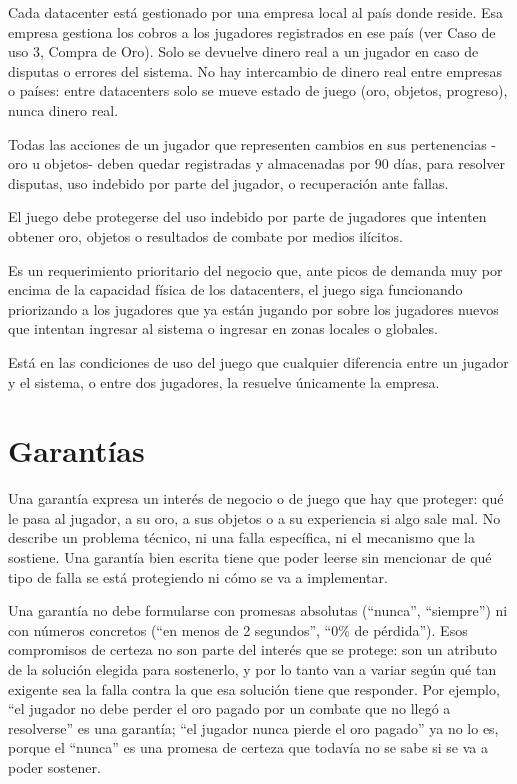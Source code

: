 \documentclass[variant=guia,cover=institutional,mode=screen]{ua-engineering-v6-article}
\begin{document}
    Cada datacenter está gestionado por una empresa local al país donde reside.
    Esa empresa gestiona los cobros a los jugadores registrados en ese país (ver Caso de uso 3, Compra de Oro).
    Solo se devuelve dinero real a un jugador en caso de disputas o errores del sistema.
    No hay intercambio de dinero real entre empresas o países: entre datacenters solo se mueve estado de juego (oro, objetos, progreso), nunca dinero real.

    Todas las acciones de un jugador que representen cambios en sus pertenencias -oro u objetos- deben quedar registradas y almacenadas por 90 días, para resolver disputas, uso indebido por parte del jugador, o recuperación ante fallas.

    El juego debe protegerse del uso indebido por parte de jugadores que intenten obtener oro, objetos o resultados de combate por medios ilícitos.

    Es un requerimiento prioritario del negocio que, ante picos de demanda muy por encima de la capacidad física de los datacenters, el juego siga funcionando priorizando a los jugadores que ya están jugando por sobre los jugadores nuevos que intentan ingresar al sistema o ingresar en zonas locales o globales.

    Está en las condiciones de uso del juego que cualquier diferencia entre un jugador y el sistema, o entre dos jugadores, la resuelve únicamente la empresa.

    \section{Garantías}\label{sec:garantias}

    Una garantía expresa un interés de negocio o de juego que hay que proteger: qué le pasa al jugador, a su oro, a sus objetos o a su experiencia si algo sale mal.
    No describe un problema técnico, ni una falla específica, ni el mecanismo que la sostiene.
    Una garantía bien escrita tiene que poder leerse sin mencionar de qué tipo de falla se está protegiendo ni cómo se va a implementar.

    Una garantía no debe formularse con promesas absolutas (``nunca'', ``siempre'') ni con números concretos (``en menos de 2 segundos'', ``0\% de pérdida'').
    Esos compromisos de certeza no son parte del interés que se protege: son un atributo de la solución elegida para sostenerlo, y por lo tanto van a variar según qué tan exigente sea la falla contra la que esa solución tiene que responder.
    Por ejemplo, ``el jugador no debe perder el oro pagado por un combate que no llegó a resolverse'' es una garantía; ``el jugador nunca pierde el oro pagado'' ya no lo es, porque el ``nunca'' es una promesa de certeza que todavía no se sabe si se va a poder sostener.
\end{document}
